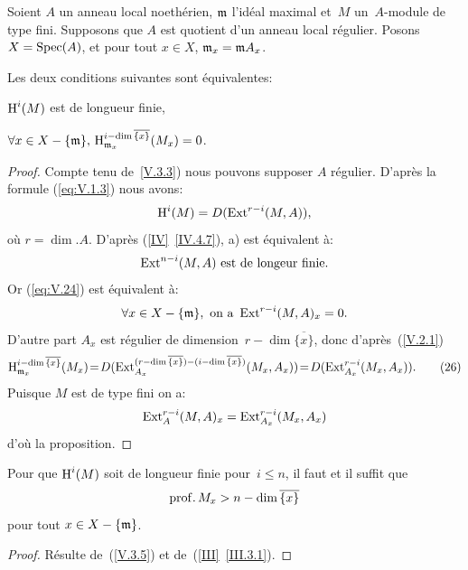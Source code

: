 Soient $A$ un anneau local noeth\'erien, $\mathfrak{m}$ l'id\'eal maximal et~$M$ un~$A$-module de type fini. Supposons que $A$ est quotient d'un anneau local r\'egulier. Posons $X=\operatorname{Spec}(A)$, et pour tout $x\in X$, $\mathfrak{m}_{x}=\mathfrak{m} A_{x}$.

\begin{proposition} \label{V.3.5}
Les deux conditions suivantes sont \'equivalentes:
\begin{enumeratea}
\item
$\operatorname{H}^{i}(M)$ est de longueur finie,
\item
$\forall x\in X-\{ \mathfrak{m}\}, \, \operatorname{H}_{\mathfrak{m}_{x}}^{i-\dim\overline{\{ x\} }}(M_{x})=0$.
\end{enumeratea}
\end{proposition}

\begin{proof}
Compte tenu de~\ref{V.3.3}) nous pouvons supposer $A$ r\'egulier. D'apr\`es la formule (\ref{eq:V.1.3}) nous avons:
$$
\operatorname{H}^{i}(M)=D(\operatorname{Ext}^{r-i}(M, A)),
$$
o\`u $r=\dim.A$. D'apr\`es (\ref{IV}~\ref{IV.4.7}), a) est
\'equivalent \`a:
\begin{equation} \label{eq:V.24} \operatorname{Ext}^{n-i}(M, A)\textrm{ est de longeur finie.}
\end{equation}
Or (\ref{eq:V.24}) est \'equivalent \`a:
\begin{equation} \label{eq:V.25} \forall x\in X-\{ \mathfrak{m}\}, \textrm{ on~a }\operatorname{Ext}^{r-i}(M, A)_{x}=0.
\end{equation}
D'autre part $A_{x}$ est r\'egulier de dimension~$r-\dim\overline{\{ x\} }$, donc d'apr\`es~(\ref{V.2.1})
\begin{equation*}%
\H_{\mm_{x}}^{i-\dim\overline{\{ x\} }}(M_{x})\!=\!D(\Ext_{A_{x}}^{(r-\dim\overline{\{ x\} })-(i-\dim\overline{\{ x\} })}(M_{x}, A_{x}))\!=\!D(\Ext_{A_{x}}^{r-i}(M_{x}, A_{x})).\tag*{(26)}
\end{equation*}
Puisque $M$ est de type fini on a:
$$
\operatorname{Ext}_{A}^{r-i}(M, A)_{x}=\operatorname{Ext}_{A_{x}}^{r-i}(M_{x}, A_{x})$$
d'o\`u la proposition.
\skipqed
\end{proof}

\begin{corollaire} \label{V.3.6} Pour que $\operatorname{H}^{i}(M)$ soit de longueur finie pour~$i\leq n$, il faut et il suffit que
$$
\mathrm{prof}.\, M_{x}>n-\dim\overline{\{ x\} }$$
pour tout $x\in X-\{ \mathfrak{m}\}$.
\end{corollaire}

\begin{proof}
R\'esulte de~(\ref{V.3.5}) et de~(\ref{III}~\ref{III.3.1}).
\skipqed
\end{proof}

